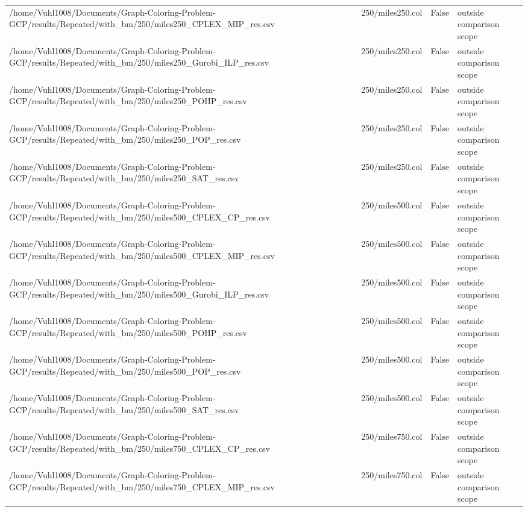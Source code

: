 \begin{table}[htbp]
\begin{tabular}{llll}
/home/Vuhl1008/Documents/Graph-Coloring-Problem-GCP/results/Repeated/with\_bm/250/miles250\_CPLEX\_MIP\_res.csv & 250/miles250.col & False & outside comparison scope \\
/home/Vuhl1008/Documents/Graph-Coloring-Problem-GCP/results/Repeated/with\_bm/250/miles250\_Gurobi\_ILP\_res.csv & 250/miles250.col & False & outside comparison scope \\
/home/Vuhl1008/Documents/Graph-Coloring-Problem-GCP/results/Repeated/with\_bm/250/miles250\_POHP\_res.csv & 250/miles250.col & False & outside comparison scope \\
/home/Vuhl1008/Documents/Graph-Coloring-Problem-GCP/results/Repeated/with\_bm/250/miles250\_POP\_res.csv & 250/miles250.col & False & outside comparison scope \\
/home/Vuhl1008/Documents/Graph-Coloring-Problem-GCP/results/Repeated/with\_bm/250/miles250\_SAT\_res.csv & 250/miles250.col & False & outside comparison scope \\
/home/Vuhl1008/Documents/Graph-Coloring-Problem-GCP/results/Repeated/with\_bm/250/miles500\_CPLEX\_CP\_res.csv & 250/miles500.col & False & outside comparison scope \\
/home/Vuhl1008/Documents/Graph-Coloring-Problem-GCP/results/Repeated/with\_bm/250/miles500\_CPLEX\_MIP\_res.csv & 250/miles500.col & False & outside comparison scope \\
/home/Vuhl1008/Documents/Graph-Coloring-Problem-GCP/results/Repeated/with\_bm/250/miles500\_Gurobi\_ILP\_res.csv & 250/miles500.col & False & outside comparison scope \\
/home/Vuhl1008/Documents/Graph-Coloring-Problem-GCP/results/Repeated/with\_bm/250/miles500\_POHP\_res.csv & 250/miles500.col & False & outside comparison scope \\
/home/Vuhl1008/Documents/Graph-Coloring-Problem-GCP/results/Repeated/with\_bm/250/miles500\_POP\_res.csv & 250/miles500.col & False & outside comparison scope \\
/home/Vuhl1008/Documents/Graph-Coloring-Problem-GCP/results/Repeated/with\_bm/250/miles500\_SAT\_res.csv & 250/miles500.col & False & outside comparison scope \\
/home/Vuhl1008/Documents/Graph-Coloring-Problem-GCP/results/Repeated/with\_bm/250/miles750\_CPLEX\_CP\_res.csv & 250/miles750.col & False & outside comparison scope \\
/home/Vuhl1008/Documents/Graph-Coloring-Problem-GCP/results/Repeated/with\_bm/250/miles750\_CPLEX\_MIP\_res.csv & 250/miles750.col & False & outside comparison scope \\

\end{tabular}
\end{table}
